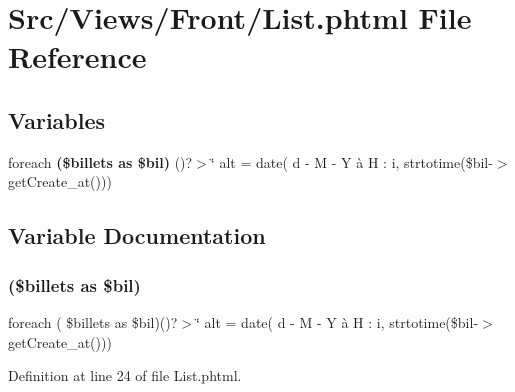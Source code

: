 \section{Src/\+Views/\+Front/\+List.phtml File Reference}
\label{_front_2_list_8phtml}
\subsection*{Variables}
\begin{DoxyCompactItemize}
\item 
foreach \textbf{ (\$billets as \$bil)} ()?$>$\char`\"{} alt = date(\textquotesingle{} d -\/ M -\/ Y à H \+: i\textquotesingle{}, strtotime(\$bil-\/$>$get\+Create\+\_\+at()))
\end{DoxyCompactItemize}


\subsection{Variable Documentation}
\mbox{\label{_front_2_list_8phtml_a1f60df41da29a5ab6912652ef3c1cea5}} 
\subsubsection{(\$billets as \$bil)}
{\footnotesize\ttfamily foreach ( \$billets as \$bil)()?$>$\char`\"{} alt = date(\textquotesingle{} d -\/ M -\/ Y à H \+: i\textquotesingle{}, strtotime(\$bil-\/$>$get\+Create\+\_\+at()))}



Definition at line 24 of file List.\+phtml.

